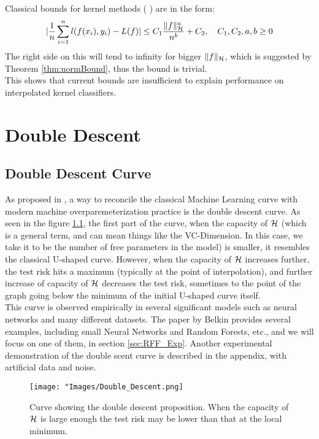 \documentclass[twoside]{memoir}
\begin{document}
Classical bounds for kernel methods (\cite{UnderstandKernel,steinwartSVM, Rudi_2015} ) are in the form:
\[ \lvert\frac{1}{n} \sum_{i=1}^{n}l(f(x_i),y_i) - L(f)\rvert \leq C_1 \frac{\lVert f\rVert^a_\mathcal{H}}{n^b} + C_2, \hspace{1em} C_1, C_2,a,b \geq 0 \]
The right side on this will tend to infinity for bigger $\lVert f\rVert_\mathcal{H}$, which is suggested by Theorem \ref{thm:normBound}, thus the bound is trivial.\\
This shows that current bounds are insufficient to explain performance on interpolated kernel classifiers.

\chapter{Double Descent}

\section{Double Descent Curve}
As proposed in \cite{Belkin_2019}, a way to reconcile the classical Machine Learning curve with modern machine overparemeterization practice is the double descent curve. As seen in the figure \ref{fig:Double_Descent}, the first part of the curve, when the capacity of $\mathcal{H}$ (which is a general term, and can mean things like the VC-Dimension. In this case, we take it to be the number of free parameters in the model) is smaller, it resembles the classical U-shaped curve. However, when the capacity of $\mathcal{H}$ increases further, the test risk hits a maximum (typically at the point of interpolation), and further increase of capacity of $\mathcal{H}$ decreases the test risk, sometimes to the point of the graph going below the minimum of the initial U-shaped curve itself. \\
This curve is observed empirically in several significant models such as neural networks and many different datasets. The paper by Belkin  provides several examples, including small Neural Networks and Random Forests, etc., and we will focus on one of them, in section \ref{sec:RFF_Exp}. Another experimental demonstration of the double scent curve is described in the appendix, with artificial data and noise.

\begin{figure}
	\centering
	\texttt{[image: "Images/Double\_Descent.png]}
	\par
	\caption{Curve showing the double descent proposition. When the capacity of $\mathcal{H}$ is large enough the test risk may be lower than that at the local minimum.} \label{fig:Double_Descent}
\end{figure}
\end{document}
